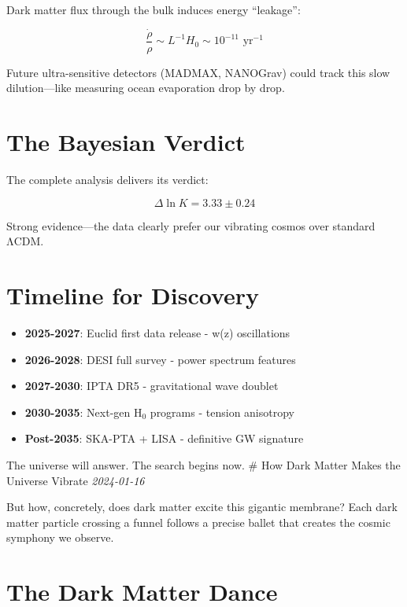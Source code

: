 \documentclass[
  11pt,
]{report}
\providecommand{\tightlist}{%
  \setlength{\itemsep}{0pt}\setlength{\parskip}{0pt}}
\begin{document}
Dark matter flux through the bulk induces energy ``leakage'':

\[\frac{\dot{\rho}}{\rho} \sim L^{-1}H_0 \sim 10^{-11} \text{ yr}^{-1}\]

Future ultra-sensitive detectors (MADMAX, NANOGrav) could track this
slow dilution---like measuring ocean evaporation drop by drop.

\section{The Bayesian Verdict}\label{the-bayesian-verdict}

The complete analysis delivers its verdict:

\[\Delta\ln K = 3.33 ± 0.24\]

Strong evidence---the data clearly prefer our vibrating cosmos over
standard ΛCDM.

\section{Timeline for Discovery}\label{timeline-for-discovery}

\begin{itemize}
\tightlist
\item
  \textbf{2025-2027}: Euclid first data release - w(z) oscillations
\item
  \textbf{2026-2028}: DESI full survey - power spectrum features\\
\item
  \textbf{2027-2030}: IPTA DR5 - gravitational wave doublet
\item
  \textbf{2030-2035}: Next-gen H\(_0\) programs - tension anisotropy
\item
  \textbf{Post-2035}: SKA-PTA + LISA - definitive GW signature
\end{itemize}

The universe will answer. The search begins now. \newpage \# How Dark
Matter Makes the Universe Vibrate \emph{2024-01-16}

But how, concretely, does dark matter excite this gigantic membrane?
Each dark matter particle crossing a funnel follows a precise ballet
that creates the cosmic symphony we observe.

\section{The Dark Matter Dance}\label{the-dark-matter-dance}
\end{document}
